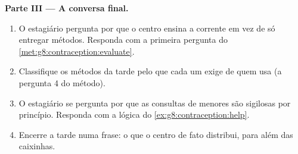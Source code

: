 \begin{problem}
\medskip\noindent\textbf{Parte III --- A conversa final.}
\begin{enumerate}[resume]
  \item O estagiário pergunta por que o centro ensina a corrente em
        vez de só entregar métodos. Responda com a primeira pergunta
        do \cref{met:g8:contraception:evaluate}.
  \item Classifique os métodos da tarde pelo que cada um exige de
        quem usa (a pergunta 4 do método).
  \item O estagiário se pergunta por que as consultas de menores são
        sigilosas por princípio. Responda com a lógica do
        \cref{ex:g8:contraception:help}.
  \item Encerre a tarde numa frase: o que o centro de fato distribui,
        para além das caixinhas.
\end{enumerate}
\end{problem}
